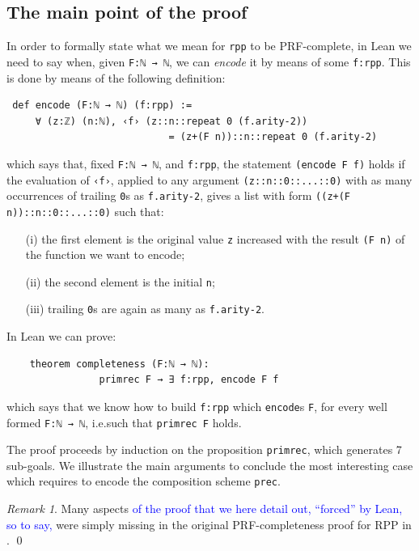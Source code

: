 \documentclass[preprint]{elsarticle}
\theoremstyle{remark}
\newtheorem{remark}{Remark}
\newcommand{\RPP}{\textsf{RPP}\xspace}
\newcommand{\PRF}{\textsf{PRF}\xspace}
\newcommand{\LEAN}{\textsf{Lean}\xspace}
\begin{document}
\subsection{The main point of the proof}
In order to formally state what we mean for \lstinline|rpp| to be \PRF-complete, in \LEAN we need to say when, given \lstinline|F:ℕ → ℕ|, we can \emph{encode} it by means of some \lstinline|f:rpp|. This is done by means of the following definition:
\begin{lstlisting}
 def encode (F:ℕ → ℕ) (f:rpp) :=
     ∀ (z:ℤ) (n:ℕ), ‹f› (z::n::repeat 0 (f.arity-2))
                            = (z+(F n))::n::repeat 0 (f.arity-2)
\end{lstlisting}
which says that, fixed \lstinline|F:ℕ → ℕ|, and \lstinline|f:rpp|, the statement \lstinline|(encode F f)| holds if the evaluation of \lstinline|‹f›|, applied to any argument \lstinline|(z::n::0::...::0)| with as many occurrences of trailing \lstinline|0|s as \lstinline|f.arity-2|, gives a list with form \lstinline|((z+(F n))::n::0::...::0)| such that:
\begin{enumerate}
    \item[(i)]
    the first element is the original value \lstinline|z| increased with the result \lstinline|(F n)| of the function we want to encode;
    \item[(ii)]
    the second element is the initial \lstinline|n|;
    \item[(iii)]
    trailing \lstinline|0|s are again as many as \lstinline|f.arity-2|.
\end{enumerate}
In \LEAN we can prove:
\begin{lstlisting}
    theorem completeness (F:ℕ → ℕ):
                primrec F → ∃ f:rpp, encode F f
\end{lstlisting}
which says that we know how to build \lstinline|f:rpp| which \lstinline|encode|s \lstinline|F|, for every well formed \lstinline|F:ℕ → ℕ|, i.e.\@ such that \lstinline|primrec F| holds.

The proof proceeds by induction on the proposition \lstinline|primrec|, which generates 7 sub-goals. We illustrate the main arguments to conclude the most interesting case which requires to encode the composition scheme \lstinline|prec|.

\begin{remark}
Many aspects \textcolor{blue}{of the proof that we here detail out, ``forced'' by \LEAN, so to say,} were simply missing in the original \PRF-completeness proof for \RPP in \cite{DBLP:journals/tcs/PaoliniPR20}.
\qed
\end{remark}
\end{document}

